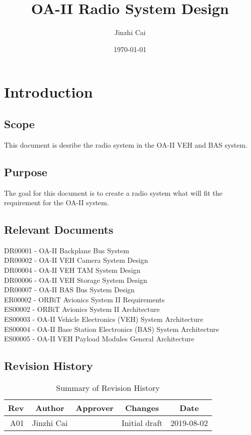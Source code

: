 \documentclass[12pt,article]{memoir}
\title{OA-II Radio System Design}
\author{Jinzhi Cai}
\date{\today}
\begin{document}
	


\tableofcontents*
\clearpage


\chapter{Introduction}
\section{Scope}
This document is desribe the radio system in the OA-II VEH and BAS system.
\section{Purpose}
The goal for this document is to create a radio system what will fit the requirement for the OA-II system.
\section{Relevant Documents}
DR00001 - OA-II Backplane Bus System\\
DR00002 - OA-II VEH Camera System Design\\
DR00004 - OA-II VEH TAM System Design\\
DR00006 - OA-II VEH Storage System Design\\
DR00007 - OA-II BAS Bus System Design\\
ER00002 - ORBiT Avionics System II Requirements\\
ES00002 - ORBiT Avionics System II Architecture\\
ES00003 - OA-II Vehicle Electronics (VEH) System Architecture\\
ES00004 - OA-II Base Station Electronics (BAS) System Architecture\\
ES00005 - OA-II VEH Payload Modules General Architecture
\section{Revision History}
\begin{table}[H]
	\centering
	\begin{tabu}{r || c | c | c | c }
		Rev & Author & Approver & Changes & Date\\ \hline
		A01 & Jinzhi Cai & & Initial draft & 2019-08-02 \\
	\end{tabu}
	\caption{Summary of Revision History}
	\label{tab:rev}
\end{table}
\newpage
\end{document}
